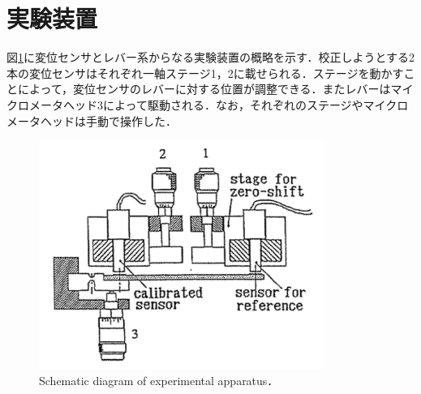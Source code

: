 \section{実験装置}
図\ref{fig:実験装置}に変位センサとレバー系からなる実験装置の概略を示す．校正しようとする2本の変位センサはそれぞれ一軸ステージ1，2に載せられる．ステージを動かすことによって，変位センサのレバーに対する位置が調整できる．またレバーはマイクロメータヘッド3によって駆動される．なお，それぞれのステージやマイクロメータヘッドは手動で操作した．
\begin{figure}[htbp]
    \centering %
    \includegraphics[width=100truemm,clip]{fig/fig_実験装置.png}
    \caption{Schematic diagram of experimental apparatus．}
    \label{fig:実験装置}
\end{figure}